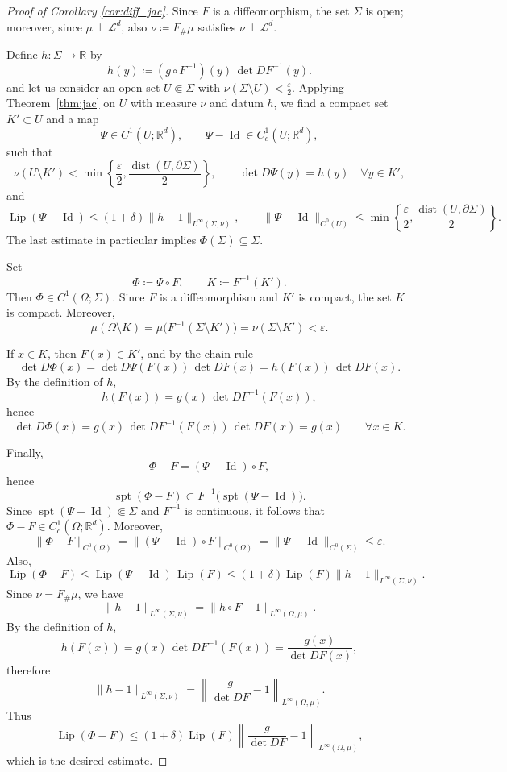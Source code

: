 \documentclass[11pt,a4paper]{article}
\newcommand{\R}{\mathbb{R}}
\newcommand{\LL}{\mathcal{L}}
\newcommand{\Lip}{\operatorname{Lip}}
\newcommand{\supp}{\operatorname{spt}}
\newcommand{\Id}{\operatorname{Id}}
\theoremstyle{definition}
\theoremstyle{remark}
\begin{document}
\begin{proof}[Proof of Corollary \ref{cor:diff_jac}]
Since $F$ is a diffeomorphism, the set $\Sigma$ is open; moreover, since $\mu\perp\LL^d$, also $\nu\coloneqq F_\#\mu$ satisfies $\nu\perp\LL^d$.

Define $h:\Sigma\to\R$ by
$$
h(y)\coloneqq (g\circ F^{-1})(y)\,\det DF^{-1}(y).
$$
and let us consider an open set $U \Subset \Sigma$ with $\nu(\Sigma\setminus U)< \frac{\varepsilon}{2}$.
Applying Theorem~\ref{thm:jac} on $U$ with measure $\nu$ and datum $h$, we find a compact set $K'\subset U$ and a map
$$
\Psi\in C^1(U;\R^d),\qquad \Psi-\Id\in C^1_c(U;\R^d),
$$
such that
$$
\nu(U\setminus K')<\min \left\{\frac{\varepsilon}{2}, \frac{\operatorname{dist}(U,\partial \Sigma)}{2} \right\},
\qquad
\det D\Psi(y)=h(y)\quad\forall y\in K',
$$
and
$$
\Lip(\Psi-\Id)\le (1+\delta)\|h-1\|_{L^\infty(\Sigma,\nu)},
\qquad
\|\Psi-\Id\|_{C^0(U)}\le \min \left\{\frac{\varepsilon}{2}, \frac{\operatorname{dist}(U,\partial \Sigma)}{2} \right\}.
$$
The last estimate in particular implies $\Phi(\Sigma)\subseteq \Sigma$.

Set
$$
\Phi\coloneqq \Psi\circ F,
\qquad
K\coloneqq F^{-1}(K').
$$
Then $\Phi\in C^1(\Omega;\Sigma)$. Since $F$ is a diffeomorphism and $K'$ is compact, the set $K$ is compact. Moreover,
$$
\mu(\Omega\setminus K)
=
\mu\bigl(F^{-1}(\Sigma\setminus K')\bigr)
=
\nu(\Sigma\setminus K')
<
\varepsilon.
$$

If $x\in K$, then $F(x)\in K'$, and by the chain rule
$$
\det D\Phi(x)
=
\det D\Psi(F(x))\,\det DF(x)
=
h(F(x))\,\det DF(x).
$$
By the definition of $h$,
$$
h(F(x))
=
g(x)\,\det DF^{-1}(F(x)),
$$
hence
$$
\det D\Phi(x)
=
g(x)\,\det DF^{-1}(F(x))\,\det DF(x)
=
g(x)
\qquad\forall x\in K.
$$

Finally,
$$
\Phi-F
=
(\Psi-\Id)\circ F,
$$
hence
$$
\supp(\Phi-F)\subset F^{-1}\bigl(\supp(\Psi-\Id)\bigr).
$$
Since $\supp(\Psi-\Id)\Subset\Sigma$ and $F^{-1}$ is continuous, it follows that $\Phi-F\in C^1_c(\Omega;\R^d)$. Moreover,
$$
\|\Phi-F\|_{C^0(\Omega)}
=
\|(\Psi-\Id)\circ F\|_{C^0(\Omega)}
=
\|\Psi-\Id\|_{C^0(\Sigma)}
\le \varepsilon.
$$
Also,
$$
\Lip(\Phi-F)
\le
\Lip(\Psi-\Id)\,\Lip(F)
\le
(1+\delta)\Lip(F)\|h-1\|_{L^\infty(\Sigma,\nu)}.
$$
Since $\nu=F_\#\mu$, we have
$$
\|h-1\|_{L^\infty(\Sigma,\nu)}
=
\|h\circ F-1\|_{L^\infty(\Omega,\mu)}.
$$
By the definition of $h$,
$$
h(F(x))
=
g(x)\,\det DF^{-1}(F(x))
=
\frac{g(x)}{\det DF(x)},
$$
therefore
$$
\|h-1\|_{L^\infty(\Sigma,\nu)}
=
\left\|\frac{g}{\det DF}-1\right\|_{L^\infty(\Omega,\mu)}.
$$
Thus
$$
\Lip(\Phi-F)\le (1+\delta)\Lip(F)
\left\|\frac{g}{\det DF}-1\right\|_{L^\infty(\Omega,\mu)},
$$
which is the desired estimate.
\end{proof}
\end{document}
